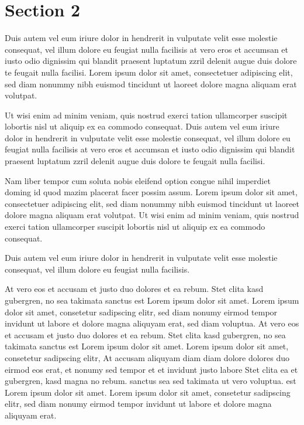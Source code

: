 \section{Section 2}
Duis autem vel eum iriure dolor in hendrerit in vulputate velit esse molestie consequat, vel illum dolore eu feugiat nulla facilisis at vero eros et accumsan et iusto odio dignissim qui blandit praesent luptatum zzril delenit augue duis dolore te feugait nulla facilisi. Lorem ipsum dolor sit amet, consectetuer adipiscing elit, sed diam nonummy nibh euismod tincidunt ut laoreet dolore magna aliquam erat volutpat.

Ut wisi enim ad minim veniam, quis nostrud exerci tation ullamcorper suscipit lobortis nisl ut aliquip ex ea commodo consequat. Duis autem vel eum iriure dolor in hendrerit in vulputate velit esse molestie consequat, vel illum dolore eu feugiat nulla facilisis at vero eros et accumsan et iusto odio dignissim qui blandit praesent luptatum zzril delenit augue duis dolore te feugait nulla facilisi.

Nam liber tempor cum soluta nobis eleifend option congue nihil imperdiet doming id quod mazim placerat facer possim assum. Lorem ipsum dolor sit amet, consectetuer adipiscing elit, sed diam nonummy nibh euismod tincidunt ut laoreet dolore magna aliquam erat volutpat. Ut wisi enim ad minim veniam, quis nostrud exerci tation ullamcorper suscipit lobortis nisl ut aliquip ex ea commodo consequat.

Duis autem vel eum iriure dolor in hendrerit in vulputate velit esse molestie consequat, vel illum dolore eu feugiat nulla facilisis. 

At vero eos et accusam et justo duo dolores et ea rebum. Stet clita kasd gubergren, no sea takimata sanctus est Lorem ipsum dolor sit amet. Lorem ipsum dolor sit amet, consetetur sadipscing elitr, sed diam nonumy eirmod tempor invidunt ut labore et dolore magna aliquyam erat, sed diam voluptua. At vero eos et accusam et justo duo dolores et ea rebum. Stet clita kasd gubergren, no sea takimata sanctus est Lorem ipsum dolor sit amet. Lorem ipsum dolor sit amet, consetetur sadipscing elitr, At accusam aliquyam diam diam dolore dolores duo eirmod eos erat, et nonumy sed tempor et et invidunt justo labore Stet clita ea et gubergren, kasd magna no rebum. sanctus sea sed takimata ut vero voluptua. est Lorem ipsum dolor sit amet. Lorem ipsum dolor sit amet, consetetur sadipscing elitr, sed diam nonumy eirmod tempor invidunt ut labore et dolore magna aliquyam erat.